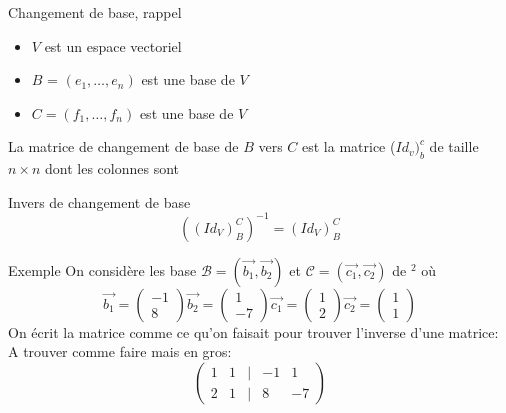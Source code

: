 \begin{parag}{Changement de base, rappel}
    \begin{itemize}
        \item $V$ est un espace vectoriel
        \item $B$  = $(e_1, \dots, e_n)$ est une base de $V$
        \item $C = (f_1, \dots, f_n)$ est une base de $V$
    \end{itemize}

\begin{definition}
    La matrice de changement de base de $B$ vers $C$ est la matrice ($Id_v)_b^c$ de taille $n \times n$ dont les colonnes sont 
\end{definition}
\begin{subparag}{Invers de changement de base}
   \[ \left((Id_V)_B^C\right)^{-1} = (Id_V)_B^C \]
\end{subparag}
\begin{subparag}{Exemple}
    On considère les base $\mathcal{B} = (\vec{b_1}, \vec{b_2})$ et $\mathcal{C} = ( \vec{c_1}, \vec{c_2})$ de \R$^2$ où
    \[\vec{b_1} = \begin{pmatrix}
        -1 \\ 8
    \end{pmatrix} \vec{b_2} = \begin{pmatrix}
        1 \\-7
    \end{pmatrix} \vec{c_1} = \begin{pmatrix}
        1 \\ 2
    \end{pmatrix} \vec{c_2} = \begin{pmatrix}
        1 \\ 1
    \end{pmatrix}\]
    On écrit la matrice comme ce qu'on faisait pour trouver l'inverse d'une matrice: 
    A trouver comme faire mais en gros:
\[\begin{pmatrix}
    1 & 1 & | & -1 & 1 \\
    2 & 1 & | & 8 & -7
\end{pmatrix}\]
\end{subparag}
\end{parag}

